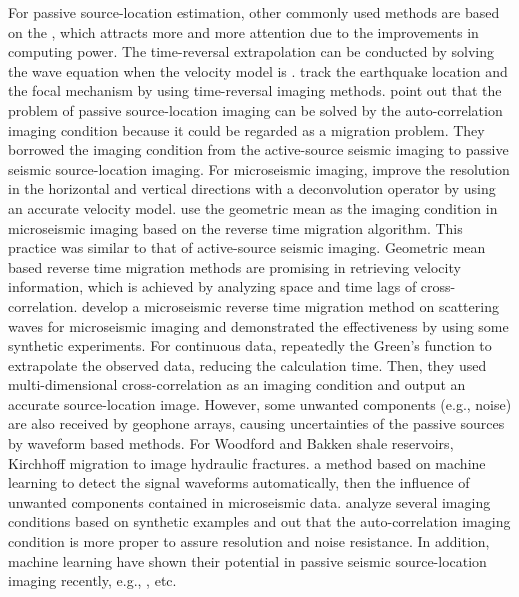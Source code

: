 For passive source-location estimation, other commonly used methods are based on the , which attracts more and more attention due to the improvements in computing power.  The time-reversal extrapolation can be conducted by solving the wave equation when the velocity model is  \cite[]{2005Reverse}. \cite{2008Time} track the earthquake location and the focal mechanism by using time-reversal imaging methods.  \cite{2010Source} point out that the problem of passive source-location imaging can be solved by the auto-correlation imaging condition because it could be regarded as a migration problem. They borrowed the imaging condition from the active-source seismic imaging to passive seismic source-location imaging. For microseismic imaging,  improve the resolution in the horizontal and vertical directions with a deconvolution operator by using an accurate velocity model. 
\cite{Nori2015} use the geometric mean as the imaging condition in microseismic imaging based on the reverse time migration algorithm. This practice was similar to that of active-source seismic imaging. Geometric mean based reverse time migration methods are promising in retrieving velocity information, which is achieved by analyzing space and time lags of cross-correlation. 
\cite{LIN201688} develop a microseismic reverse time migration method on scattering waves for microseismic imaging and demonstrated the effectiveness by using some synthetic experiments. For continuous data, \cite{Norimitsu2016} repeatedly  the Green's function to extrapolate the observed data, reducing the calculation time. Then, they used multi-dimensional cross-correlation as an imaging condition and output an accurate source-location image.
However, some unwanted components (e.g., noise) are also received by geophone arrays, causing uncertainties of the passive sources by waveform based methods. 
For Woodford and Bakken shale reservoirs, \cite{Grechka2017High}  Kirchhoff migration to image hydraulic fractures. 
 \cite{Chen2018fast}  a method based on machine learning to detect the signal waveforms automatically, then  the influence of unwanted components contained in microseismic data. 
\cite{Jianlong2020} analyze several imaging conditions based on synthetic examples and  out that the auto-correlation imaging condition is more proper to assure  resolution and noise resistance. 
In addition, machine learning  have  shown their potential in passive seismic source-location imaging recently, e.g.,  \cite{Jubran2017, qushan2020gji, Hanchen2020, Omar2020, Yatong2020}, etc.  


